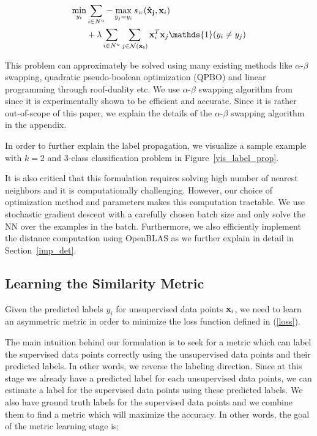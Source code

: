 \begin{equation}
\begin{aligned}
\min_{y_i}  &\sum_{i \in N^u} - \max_{\hat{y}_j=y_i}  \sw(\mathbf{\hat{x}_j},\mathbf{x}_{i}) \\
&+ \lambda
\sum_{i \in N^u} \sum_{j \in \mathcal{N}(\mathbf{x_i})} \mathbf{x}_i^T \mathbf{x}_j\mathds{1}(y_i \neq y_j)
\end{aligned}
\label{robtran}
\end{equation}

This problem can approximately be solved using many existing methods like $\alpha$-$\beta$ swapping, quadratic pseudo-boolean optimization (QPBO) and linear programming through roof-duality etc. We use $\alpha$-$\beta$ swapping algorithm from \cite{kolmogrovalphabeta} since it is experimentally shown to be efficient and accurate. Since it is rather out-of-scope of this paper, we explain the details of the $\alpha$-$\beta$ swapping algorithm in the appendix.

In order to further explain the label propagation, we visualize a sample example with $k=2$ and $3$-class classification problem in Figure~\ref{vis_label_prop}. 

It is also critical that this formulation requires solving high number of nearest neighbors and it is computationally challenging. However, our choice of optimization method and parameters makes this computation tractable. We use stochastic gradient descent with a carefully chosen batch size and only solve the NN over the examples in the batch. Furthermore, we also efficiently implement the distance computation using OpenBLAS as we further explain in detail in Section~\ref{imp_det}. 


\subsection{Learning the Similarity Metric}
\label{metric}
Given the predicted labels $y_i$ for unsupervised data points $\mathbf{x}_i$, we need to learn an asymmetric metric in order to minimize the loss function defined in (\ref{loss}). 

The main intuition behind our formulation is to seek for a metric which can label the supervised data points correctly using the unsupervised data points and their predicted labels. In other words, we reverse the labeling direction. Since at this stage we already have a predicted label for each unsupervised data points, we can estimate a label for the supervised data points using these predicted labels. We also have ground truth labels for the supervised data points and we combine them to find a metric which will maximize the accuracy. In other words, the goal of the metric learning stage is;

